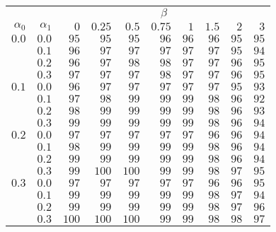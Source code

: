 \begin{tabular}{rr|rrrrrrrr}
\hline\hline
 && \multicolumn{8}{c}{$\beta$}\\
 $\alpha_0$ & $\alpha_1$ & $0$ & $0.25$ & $0.5$ & $0.75$ & $1$ & $1.5$ & $2$ & $3$ \\ 
 \hline
$0.0$ & $0.0$ & $ 95$ & $ 95$ & $ 95$ & $96$ & $96$ & $96$ & $95$ & $95$\\ 
 & $0.1$ & $ 96$ & $ 97$ & $ 97$ & $97$ & $97$ & $97$ & $95$ & $94$\\ 
 & $0.2$ & $ 96$ & $ 97$ & $ 98$ & $98$ & $97$ & $97$ & $96$ & $95$\\ 
 & $0.3$ & $ 97$ & $ 97$ & $ 97$ & $98$ & $97$ & $97$ & $96$ & $95$\\ 
\hline 
 $0.1$ & $0.0$ & $ 96$ & $ 97$ & $ 97$ & $97$ & $97$ & $97$ & $95$ & $93$\\ 
 & $0.1$ & $ 97$ & $ 98$ & $ 99$ & $99$ & $99$ & $98$ & $96$ & $92$\\ 
 & $0.2$ & $ 98$ & $ 99$ & $ 99$ & $99$ & $99$ & $98$ & $96$ & $93$\\ 
 & $0.3$ & $ 99$ & $ 99$ & $ 99$ & $99$ & $99$ & $98$ & $96$ & $94$\\ 
\hline 
 $0.2$ & $0.0$ & $ 97$ & $ 97$ & $ 97$ & $97$ & $97$ & $96$ & $96$ & $94$\\ 
 & $0.1$ & $ 98$ & $ 99$ & $ 99$ & $99$ & $99$ & $98$ & $96$ & $94$\\ 
 & $0.2$ & $ 99$ & $ 99$ & $ 99$ & $99$ & $99$ & $98$ & $96$ & $94$\\ 
 & $0.3$ & $ 99$ & $100$ & $100$ & $99$ & $99$ & $98$ & $97$ & $95$\\ 
\hline 
 $0.3$ & $0.0$ & $ 97$ & $ 97$ & $ 97$ & $97$ & $97$ & $96$ & $96$ & $95$\\ 
 & $0.1$ & $ 99$ & $ 99$ & $ 99$ & $99$ & $99$ & $98$ & $97$ & $94$\\ 
 & $0.2$ & $ 99$ & $ 99$ & $ 99$ & $99$ & $99$ & $98$ & $97$ & $96$\\ 
 & $0.3$ & $100$ & $100$ & $100$ & $99$ & $99$ & $98$ & $98$ & $97$\\ 
 \hline 
 \end{tabular}